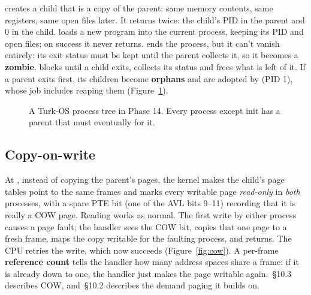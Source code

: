 \documentclass[11pt,a4paper]{article}
\begin{document}
\textbf{} creates a child that is a copy of the parent: same memory contents, same registers, same open
files later. It returns twice: the child's PID in the parent and 0 in the child. \textbf{} loads a new program into the current process, keeping its PID and open files; on success it never returns.
\textbf{} ends the process, but it can't vanish entirely: its exit status must be kept until the
parent collects it, so it becomes a \textbf{zombie}. \textbf{} blocks until a
child exits, collects its status and frees what is left of it. If a parent exits first, its children become
\textbf{orphans} and are adopted by  (PID 1), whose job includes reaping them (Figure~\ref{fig:tree}).

\begin{figure}[htbp]
\centering
{}
\caption{A Turk-OS process tree in Phase 14. Every process except init has a parent that must eventually  for it.}
\label{fig:tree}
\end{figure}

\subsection{Copy-on-write}

At , instead of copying the parent's pages, the kernel makes the child's page tables point to the same
frames and marks every writable page \emph{read-only} in \emph{both} processes, with a spare PTE bit (one of the AVL
bits 9--11) recording that it is really a COW page. Reading works as normal. The first write by either process causes
a page fault; the handler sees the COW bit, copies that one page to a fresh frame, maps the copy writable for the
faulting process, and returns. The CPU retries the write, which now succeeds (Figure~\ref{fig:cow}). A per-frame
\textbf{reference count} tells the handler how many address spaces share a frame: if it is already down to one, the
handler just makes the page writable again. \OSC\,\S10.3 describes COW, and \OSC\,\S10.2 describes the demand paging
it builds on.
\end{document}
